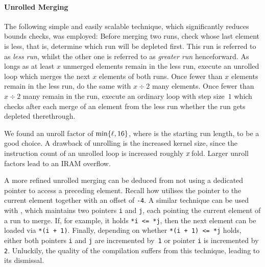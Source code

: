 \paragraph{Unrolled Merging}
The following simple and easily scalable technique, which significantly reduces bounds checks, was employed:
Before merging two runs, check whose last element is less, that is, determine which run will be depleted first.
This run is referred to as \emph{less run}, whilst the other one is referred to as \emph{greater run} henceforward.
As longs as at least \(x\) unmerged elements remain in the less run, execute an unrolled loop which merges the next \(x\) elements of both runs.
Once fewer than \(x\) elements remain in the less run, do the same with \(x \div 2\) many elements.
Once fewer than \(x \div 2\) many remain in the run, execute an ordinary loop with step size~\(1\) which checks after each merge of an element from the less run whether the run gets depleted therethrough.

We found an unroll factor of \(\min\{ \ell, 16 \}\), where \startingrun{} is the starting run length, to be a good choice.
A drawback of unrolling is the increased kernel size, since the instruction count of an unrolled loop is increased roughly \(x\kern .125em\)fold.
Larger unroll factors lead to an \ac{IRAM} overflow.

A more refined unrolled merging can be deduced from \IS{} not using a dedicated pointer to access a preceding element.
Recall how \IS{} utilises the pointer to the current element together with an offset of \lstinline|-4|.
A similar technique can be used with \MS{}, which maintains two pointers \lstinline|i| and \lstinline|j|, each pointing the current element of a run to merge.
If, for example, it holds \lstinline|*i <= *j|, then the next element can be loaded via \lstinline|*(i + 1)|.
Finally, depending on whether \lstinline|*(i + 1) <= *j| holds, either both pointers \lstinline|i| and \lstinline|j| are incremented by~\lstinline|1| or pointer \lstinline|i| is incremented by \lstinline|2|.
Unluckily, the quality of the compilation suffers from this technique, leading to its dismissal.
